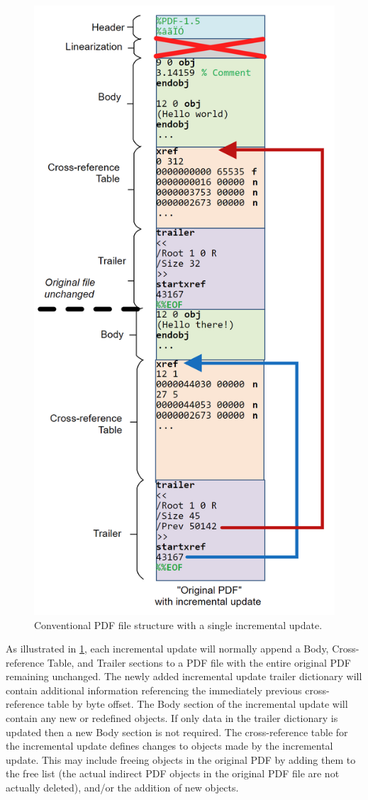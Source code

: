 \begin{figure}[t]
    \centering
    \includegraphics[width=0.65\linewidth]{figures/pdf-structure-incremental.png}
    \caption{Conventional PDF file structure with a single incremental update.}
    \label{fig:pdf-structure-incremental}
\end{figure}

As illustrated in \cref{fig:pdf-structure-incremental}, each incremental update will 
normally append a Body, Cross-reference Table, and Trailer sections
to a PDF file with the entire original PDF remaining unchanged. The newly added incremental
update trailer dictionary will contain additional information referencing the immediately 
previous cross-reference table by byte offset. The Body section of the incremental update 
will contain any new or redefined objects. If only data in the trailer dictionary is updated then
a new Body section is not required. The cross-reference table for the incremental update
defines changes to objects made by the incremental update. This may include freeing
objects in the original PDF by adding them to the free list (the actual indirect PDF objects in
the original PDF file are not actually deleted), and/or the addition of new objects. 

